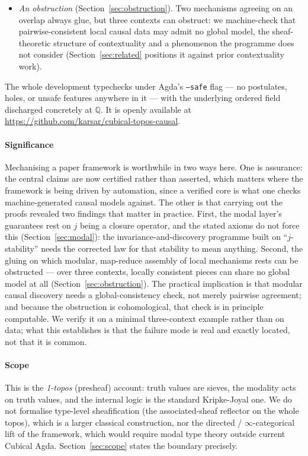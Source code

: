 \documentclass{lmcs}
\begin{document}
\begin{itemize}
\item \emph{An obstruction} (Section~\ref{sec:obstruction}). Two mechanisms agreeing on an overlap always glue, but three contexts can obstruct: we machine-check that pairwise-consistent local causal data may admit no global model, the sheaf-theoretic structure of contextuality and a phenomenon the programme does not consider (Section~\ref{sec:related} positions it against prior contextuality work).
\end{itemize}
The whole development typechecks under Agda's \texttt{--safe} flag --- no postulates, holes, or unsafe features anywhere in it --- with the underlying ordered field discharged concretely at $\mathbb{Q}$. It is openly available at \url{https://github.com/karsar/cubical-topos-causal}.

\paragraph{Significance}
Mechanising a paper framework is worthwhile in two ways here.
One is assurance: the central claims are now certified rather than asserted, which matters where the framework is being driven by automation, since a verified core is what one checks machine-generated causal models against.
The other is that carrying out the proofs revealed two findings that matter in practice.
First, the modal layer's guarantees rest on $j$ being a closure operator, and the stated axioms do not force this (Section~\ref{sec:modal}): the invariance-and-discovery programme built on ``$j$-stability'' needs the corrected law for that stability to mean anything.
Second, the gluing on which modular, map-reduce assembly of local mechanisms rests can be obstructed --- over three contexts, locally consistent pieces can share no global model at all (Section~\ref{sec:obstruction}).
The practical implication is that modular causal discovery needs a global-consistency check, not merely pairwise agreement; and because the obstruction is cohomological, that check is in principle computable.
We verify it on a minimal three-context example rather than on data; what this establishes is that the failure mode is real and exactly located, not that it is common.

\paragraph{Scope}
This is the \emph{1-topos} (presheaf) account: truth values are sieves, the modality acts on truth values, and the internal logic is the standard Kripke-Joyal one.
We do not formalise type-level sheafification (the associated-sheaf reflector on the whole topos), which is a larger classical construction, nor the directed / $\infty$-categorical lift of the framework, which would require modal type theory outside current Cubical Agda.
Section~\ref{sec:scope} states the boundary precisely.
\end{document}
